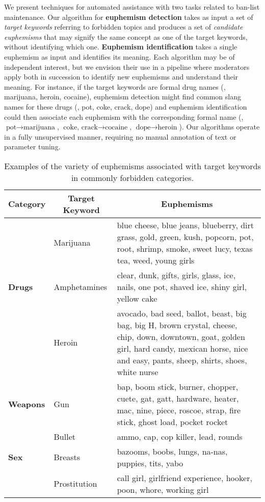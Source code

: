 We present techniques for automated assistance
with two tasks related to ban-list maintenance.
Our algorithm for \textbf{euphemism detection}
takes as input a set of \textit{target keywords} referring to forbidden topics
and produces a set of \textit{candidate euphemisms}
that may signify the same concept as one of the target keywords,
without identifying which one.
\textbf{Euphemism identification} takes a single euphemism as input
and identifies its meaning.
Each algorithm may be of independent interest,
but we envision their use in a pipeline
where moderators apply both in succession
to identify new euphemisms and understand their meaning.
For instance, if the target keywords are formal drug names 
(\eg, marijuana, heroin, cocaine),
euphemism detection might find common slang names for these drugs
(\eg, pot, coke, crack,  dope)
and euphemism identification could then associate each euphemism
with the corresponding formal name
(\eg, $\text{pot} \longrightarrow \text{marijuana}$,
$\text{coke, crack} \longrightarrow \text{cocaine}$,
$\text{dope} \longrightarrow \text{heroin}$).
Our algorithms operate in a fully unsupervised manner,
requiring no manual annotation of text
or parameter tuning.

\begin{table*}[t!]
	\centering
	\small
	\caption{Examples of the variety of euphemisms associated with target keywords in commonly forbidden categories.}
	\begin{tabular}{llp{}}
		\toprule
		\multicolumn{1}{c}{\textbf{Category}} & \multicolumn{1}{c}{\textbf{Target Keyword}} & \multicolumn{1}{c}{\textbf{Euphemisms}} \\
		\midrule
                                 & Marijuana    & blue cheese, blue jeans, blueberry, dirt grass, gold, green, kush, popcorn, pot, root, shrimp, smoke, sweet lucy, texas tea, weed, young girls \\
                \textbf{Drugs}   & Amphetamines & clear, dunk, gifts, girls, glass, ice, nails, one pot, shaved ice, shiny girl, yellow cake \\
                                 & Heroin       & avocado, bad seed, ballot, beast, big bag, big H, brown crystal, cheese, chip, down, downtown, goat, golden girl, hard candy, mexican horse, nice and easy, pants, sheep, shirts, shoes, white nurse \\
                \addlinespace
                \textbf{Weapons} & Gun          & bap, boom stick, burner, chopper, cuete, gat, gatt, hardware, heater, mac, nine, piece, roscoe, strap, fire stick, ghost load, pocket rocket \\
                                 & Bullet       & ammo, cap, cop killer, lead, rounds \\
                \addlinespace
                \textbf{Sex}     & Breasts      & bazooms, boobs, lungs, na-nas, puppies, tits, yabo \\
                                 & Prostitution & call girl, girlfriend experience, hooker, poon, whore, working girl \\
    \bottomrule
	\end{tabular}
	\label{table:example2}
\end{table*}

